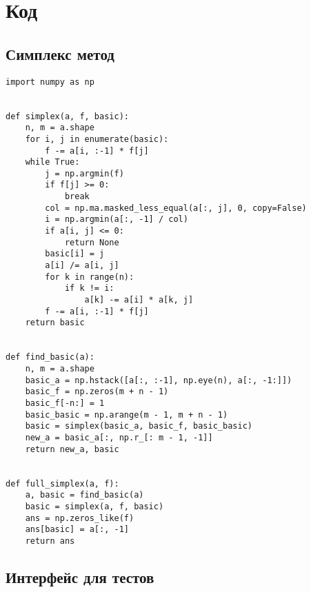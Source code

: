 \documentclass[11pt]{article}
\author{megabluejay}
\date{}
\title{}
\begin{document}
\section*{Код}
\label{sec:org0b29397}

\subsection*{Симплекс метод}
\label{sec:org3c9f60a}

\begin{verbatim}
import numpy as np


def simplex(a, f, basic):
    n, m = a.shape
    for i, j in enumerate(basic):
        f -= a[i, :-1] * f[j]
    while True:
        j = np.argmin(f)
        if f[j] >= 0:
            break
        col = np.ma.masked_less_equal(a[:, j], 0, copy=False)
        i = np.argmin(a[:, -1] / col)
        if a[i, j] <= 0:
            return None
        basic[i] = j
        a[i] /= a[i, j]
        for k in range(n):
            if k != i:
                a[k] -= a[i] * a[k, j]
        f -= a[i, :-1] * f[j]
    return basic


def find_basic(a):
    n, m = a.shape
    basic_a = np.hstack([a[:, :-1], np.eye(n), a[:, -1:]])
    basic_f = np.zeros(m + n - 1)
    basic_f[-n:] = 1
    basic_basic = np.arange(m - 1, m + n - 1)
    basic = simplex(basic_a, basic_f, basic_basic)
    new_a = basic_a[:, np.r_[: m - 1, -1]]
    return new_a, basic


def full_simplex(a, f):
    a, basic = find_basic(a)
    basic = simplex(a, f, basic)
    ans = np.zeros_like(f)
    ans[basic] = a[:, -1]
    return ans
\end{verbatim}

\subsection*{Интерфейс для тестов}
\label{sec:orgd269b4b}
\end{document}
